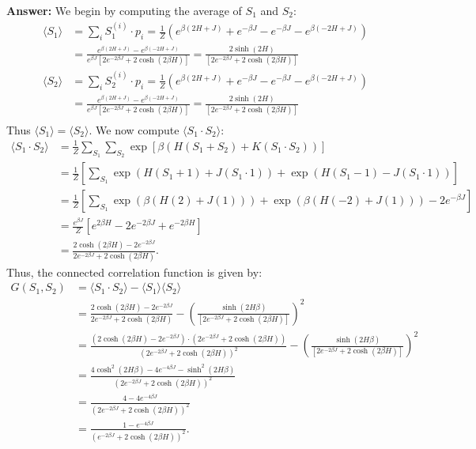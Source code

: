 \documentclass[a4paper]{article}
\newcommand{\newparagraph}{\vspace{.5cm}\noindent}
\newcommand{\average}[1]{\langle #1 \rangle}
\begin{document}
\newparagraph
\textbf{Answer:} We begin by computing the average of $S_1$ and $S_2$:
\begin{align*}
    \average{S_1} &= \sum_i S_1^{(i)} \cdot p_i = \frac{1}{Z}\left(e^{\beta(2H + J)} + e^{-\beta J} - e^{-\beta J} - e^{\beta(-2H + J)}\right)\\
    &= \frac{e^{\beta(2H + J)} - e^{\beta(-2H + J)}}{e^{\beta J}\left[2e^{-2\beta J} + 2\cosh(2\beta H)\right]} = \frac{2\sinh(2H)}{\left[2e^{-2\beta J} + 2\cosh(2\beta H)\right]}\\
    \average{S_2} &= \sum_i S_2^{(i)} \cdot p_i = \frac{1}{Z}\left(e^{\beta(2H + J)} + e^{-\beta J} - e^{-\beta J} - e^{\beta(-2H + J)}\right)\\
    &= \frac{e^{\beta(2H + J)} - e^{\beta(-2H + J)}}{e^{\beta J}\left[2e^{-2\beta J} + 2\cosh(2\beta H)\right]} = \frac{2\sinh(2H)}{\left[2e^{-2\beta J} + 2\cosh(2\beta H)\right]}\\
\end{align*}Thus $\average{S_1} = \average{S_2}$. We now compute $\average{S_1\cdot S_2}$:
\begin{align*}
    \average{S_1\cdot S_2} &=\frac{1}{Z}\sum_{S_1}\sum_{S_2}\exp\left[\beta\left(H(S_1 + S_2) + K(S_1\cdot S_2)\right)\right]\\
    &= \frac{1}{Z}\left[\sum_{S_1}\exp\left(H(S_1 + 1) + J(S_1\cdot 1)\right) + \exp\left(H(S_1 - 1) - J(S_1 \cdot1)\right)\right]\\
    &= \frac{1}{Z}\left[\sum_{S_1}\exp\left(\beta(H(2) + J(1))\right) + \exp\left(\beta(H(-2) + J(1))\right) - 2e^{-\beta J}\right]\\
    &=\frac{e^{\beta J}}{Z}\left[e^{2\beta H} - 2e^{-2\beta J} + e^{-2\beta H}\right]\\
    &= \frac{2\cosh(2\beta H)-2e^{-2\beta J}}{2e^{-2\beta J} + 2\cosh(2\beta H)}.
\end{align*}Thus, the connected correlation function is given by:
\begin{align*}
    G(S_1,S_2) &= \average{S_1\cdot S_2} - \average{S_1}\average{S_2}\\
    &= \frac{2\cosh(2\beta H)-2e^{-2\beta J}}{2e^{-2\beta J} + 2\cosh(2\beta H)} - \left(\frac{\sinh(2H\beta)}{\left[2e^{-2\beta J} + 2\cosh(2\beta H)\right]}\right)^2\\
    &= \frac{\left(2\cosh(2\beta H)-2e^{-2\beta J}\right)\cdot(2e^{-2\beta J} + 2\cosh(2\beta H))}{(2e^{-2\beta J} + 2\cosh(2\beta H))^2} - \left(\frac{\sinh(2H\beta)}{\left[2e^{-2\beta J} + 2\cosh(2\beta H)\right]}\right)^2\\
    &= \frac{4\cosh^2\left(2H\beta\right) - 4 e^{-4\beta J}-\sinh^2\left(2H\beta\right)}{(2e^{-2\beta J} + 2\cosh(2\beta H))^2}\\
    &= \frac{4 - 4 e^{-4\beta J}}{(2e^{-2\beta J} + 2\cosh(2\beta H))^2}\\
    &= \frac{1-e^{-4\beta J}}{\left(e^{-2\beta J} + 2\cosh(2\beta H)\right)^2}.
\end{align*}
\end{document}
